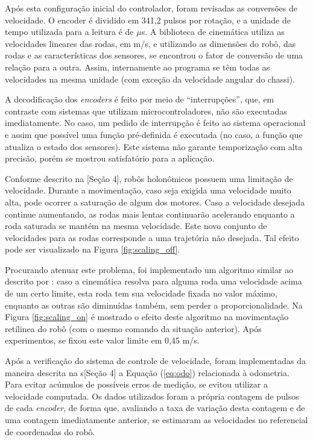 Após esta configuração inicial do controlador, foram revisadas as conversões de velocidade. O encoder é dividido em 341,2 pulsos por rotação, e a unidade de tempo utilizada para a leitura é de $\mu$s. A biblioteca de cinemática utiliza as velocidades lineares das rodas, em m/s, e utilizando as dimensões do robô, das rodas e as características dos sensores, se encontrou o fator de conversão de uma relação para a outra. Assim, internamente ao programa se têm todas as velocidades na mesma unidade (com exceção da velocidade angular do chassi).

A decodificação dos \textit{encoders} é feito por meio de ``interrupções'', que, em contraste com sistemas que utilizam microcontroladores, não são executadas imediatamente. No caso, um pedido de interrupção é feito ao sistema operacional e assim que possível uma função pré-definida é executada (no caso, a função que atualiza o estado dos sensores). Este sistema não garante temporização com alta precisão, porém se mostrou satisfatório para a aplicação.

Conforme descrito na \hyperref[sec:software][Seção 4], robôs holonômicos possuem uma limitação de velocidade. Durante a movimentação, caso seja exigida uma velocidade muito alta, pode ocorrer a saturação de algum dos motores. Caso a velocidade desejada continue aumentando, as rodas mais lentas continuarão acelerando enquanto a roda saturada se mantém na mesma velocidade. Este novo conjunto de velocidades para as rodas corresponde a uma trajetória não desejada. Tal efeito pode ser visualizado na Figura \ref{fig:scaling_off}.

Procurando atenuar este problema, foi implementado um algoritmo similar ao descrito por \citet{indiveri2009swedish}: caso a cinemática resolva para alguma roda uma velocidade acima de um certo limite, esta roda tem sua velocidade fixada no valor máximo, enquanto as outras são diminuídas também, sem perder a proporcionalidade. Na Figura \ref{fig:scaling_on} é mostrado o efeito deste algoritmo na movimentação retílinea do robô (com o mesmo comando da situação anterior). Após experimentos, se fixou este valor limite em 0,45 m/s.

Após a verificação do sistema de controle de velocidade, foram implementadas da maneira descrita na s\hyperref[sec:software][Seção 4] a Equação (\ref{eq:odo}) relacionada à odometria. Para evitar acúmulos de possíveis erros de medição, se evitou utilizar a velocidade computada. Os dados utilizados foram a própria contagem de pulsos de cada \textit{encoder}, de forma que, avaliando a taxa de variação desta contagem e de uma contagem imediatamente anterior, se estimaram as velocidades no referencial de coordenadas do robô.

